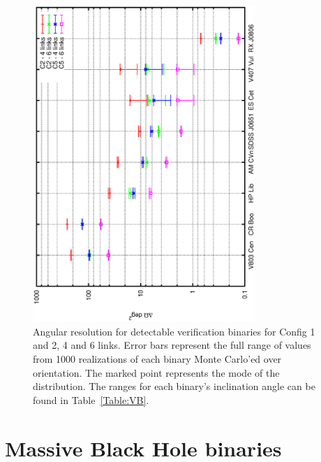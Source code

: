 \documentclass{iopart}
\begin{document}
\begin{figure}[H]
\begin{center}
   \includegraphics[angle=270, width=0.75\textwidth]{FigGBTyson/Omega.eps} %
   \caption{Angular resolution for detectable verification binaries for Config 1 and 2, 4 and 6 links.  Error bars represent the full range of values from 1000 realizations of each binary Monte Carlo'ed over orientation.  The marked point represents the mode of the distribution.  The ranges for each binary's inclination angle can be found in Table~\ref{Table:VB}.}
   \label{Figure:VBOmega}
   \end{center}
\end{figure}


\section{ Massive Black Hole binaries}
\label{S:MBHb}
\end{document}

